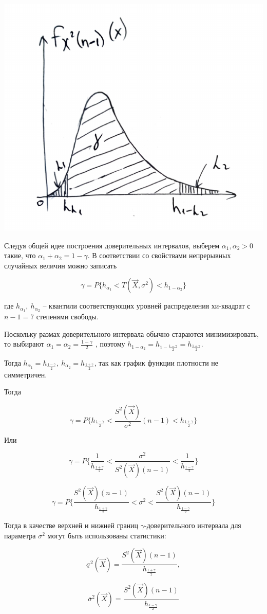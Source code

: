 \documentclass[a4paper,14pt]{extreport} %
\begin{document}
\begin{enumerate}
\includegraphics[scale=0.45]{1.pdf}

Следуя общей идее построения доверительных интервалов, выберем $\alpha_1,\alpha_2 > 0$ такие, что $\alpha_1+\alpha_2 = 1- \gamma$. В соответствии со свойствами непрерывных случайных величин можно записать

$$\gamma=P\{h_{\alpha_1}<T(\vec X, \sigma^2)<h_{1-\alpha_2}\}$$

где $h_{\alpha_1},~h_{\alpha_2}$ -- квантили соответствующих уровней распределения хи-квадрат с $n-1=7$ степенями свободы. 

Поскольку размах доверительного интервала обычно стараются минимизировать, то выбирают
$\alpha_1=\alpha_2=\frac{1-\gamma}{2}$ , поэтому $h_{1-\alpha_2}=h_{1-\frac{1-\gamma}{2}}=h_{\frac{1+\gamma}{2}}$. 

Тогда $h_{\alpha_1}=h_{\frac{1-\gamma}{2}},~h_{\alpha_2}=h_{\frac{1+\gamma}{2}}$, так как график функции плотности не симметричен. 

Тогда

$$\gamma=P\bigg\{h_{\frac{1-\gamma}{2}}<\frac{S^2(\vec X)}{\sigma^2}(n-1)<h_{\frac{1+\gamma}{2}}\bigg\}$$

Или

$$\gamma=P\bigg\{\frac{1}{h_{\frac{1+\gamma}{2}}}<\frac{\sigma^2}{S^2(\vec X)(n-1)}<\frac{1}{h_{\frac{1-\gamma}{2}}}\bigg\}$$

$$\gamma=P\bigg\{\frac{S^2(\vec X)(n-1)}{h_{\frac{1+\gamma}{2}}}<\sigma^2<\frac{S^2(\vec X)(n-1)}{h_{\frac{1-\gamma}{2}}}\bigg\}$$

Тогда в качестве верхней и нижней границ $\gamma$-доверительного интервала для параметра $\sigma^2$ могут быть использованы статистики:

$$\underline\sigma^2(\vec X)=\frac{S^2(\vec X)(n-1)}{h_{\frac{1+\gamma}{2}}},$$

$$\overline\sigma^2(\vec X)=\frac{S^2(\vec X)(n-1)}{h_{\frac{1-\gamma}{2}}}$$

\end{enumerate}
\end{document}
